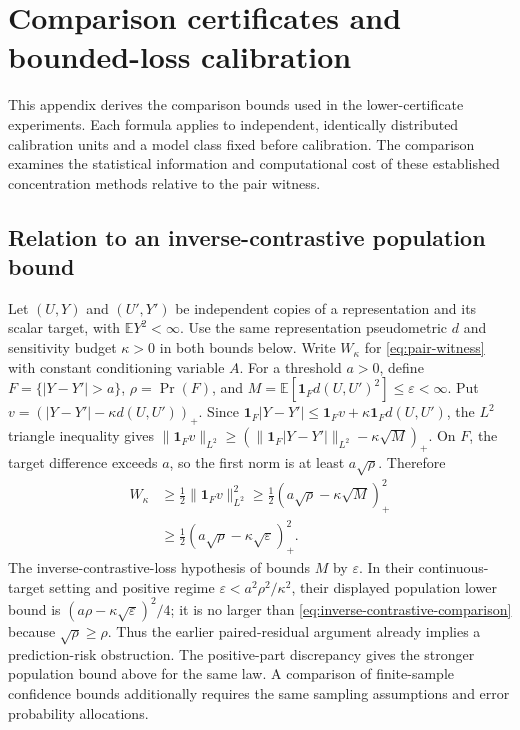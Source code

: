 \section{Comparison certificates and bounded-loss calibration}
\label{app:witness-analysis}

This appendix derives the comparison bounds used in the lower-certificate
experiments. Each formula applies to independent, identically distributed
calibration units and a model class fixed before calibration. The comparison
examines the statistical information and computational cost of these
established concentration methods relative to the pair witness.

\subsection{Relation to an inverse-contrastive population bound}
\label{app:inverse-contrastive}

Let $(U,Y)$ and $(U',Y')$ be independent copies of a representation and
its scalar target, with $\mathbb E Y^2<\infty$. Use the same representation
pseudometric $d$ and sensitivity budget $\kappa>0$ in both bounds below.
Write $W_\kappa$ for \eqref{eq:pair-witness} with constant conditioning
variable $A$. For a threshold $a>0$, define
$F=\{|Y-Y'|>a\}$, $\rho=\Pr(F)$, and
$M=\mathbb E[\mathbf1_F d(U,U')^2]\leq\varepsilon<\infty$.
Put $v=(|Y-Y'|-\kappa d(U,U'))_+$.
Since $\mathbf1_F|Y-Y'|\leq\mathbf1_Fv+
\kappa\mathbf1_Fd(U,U')$, the $L^2$ triangle inequality gives
$\|\mathbf1_Fv\|_{L^2}\geq
(\|\mathbf1_F|Y-Y'|\|_{L^2}-\kappa\sqrt M)_+$.
On $F$, the target difference exceeds $a$, so the first norm is at least
$a\sqrt\rho$. Therefore
\begin{equation}
 \begin{split}
 W_\kappa&\geq\tfrac12\|\mathbf1_Fv\|_{L^2}^2
 \geq\tfrac12(a\sqrt\rho-\kappa\sqrt M)_+^2\\
 &\geq\tfrac12(a\sqrt\rho-\kappa\sqrt\varepsilon)_+^2.
 \end{split}
 \label{eq:inverse-contrastive-comparison}
\end{equation}
The inverse-contrastive-loss hypothesis of
\citet[Lemma~2 and its appendix proof]{akash2021inverse} bounds $M$ by
$\varepsilon$. In their continuous-target setting and positive regime
$\varepsilon<a^2\rho^2/\kappa^2$, their displayed population lower bound
is $(a\rho-\kappa\sqrt\varepsilon)^2/4$; it is no larger than
\eqref{eq:inverse-contrastive-comparison} because $\sqrt\rho\geq\rho$.
Thus the earlier paired-residual argument already implies a prediction-risk
obstruction. The positive-part discrepancy gives the stronger population
bound above for the same law. A comparison of finite-sample confidence
bounds additionally requires the same sampling assumptions and error
probability allocations.

